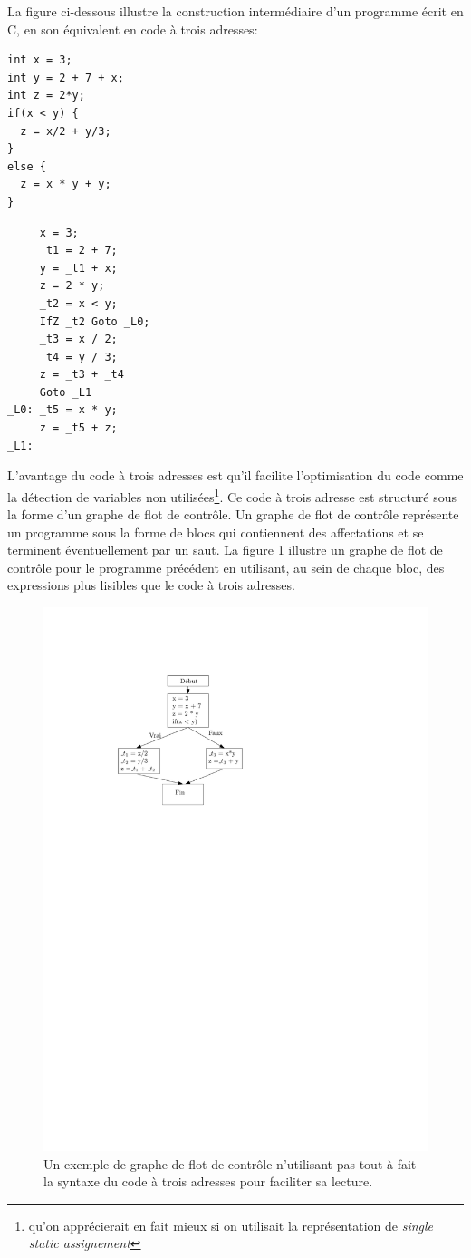 La figure ci-dessous illustre la construction intermédiaire d'un programme écrit en C, en son équivalent en code à trois adresses:

\begin{minipage}[c]{0.4\linewidth}
\begin{lstlisting}
int x = 3;
int y = 2 + 7 + x;
int z = 2*y;
if(x < y) {
  z = x/2 + y/3;
}
else {
  z = x * y + y;
}
\end{lstlisting}
\end{minipage}
\begin{minipage}[c]{0.5\linewidth}
\begin{verbatim}
     x = 3;
     _t1 = 2 + 7;
     y = _t1 + x;
     z = 2 * y;
     _t2 = x < y;
     IfZ _t2 Goto _L0;
     _t3 = x / 2;
     _t4 = y / 3;
     z = _t3 + _t4
     Goto _L1
_L0: _t5 = x * y;
     z = _t5 + z;
_L1:
\end{verbatim}
\end{minipage}

L'avantage du code à trois adresses est qu'il facilite l'optimisation du code comme la détection de variables non utilisées\footnote{qu'on apprécierait en fait mieux si on utilisait la représentation de \emph{single static assignement}}. Ce code à trois adresse est structuré sous la forme d'un graphe de flot de contrôle. Un graphe de flot de contrôle représente un programme sous la forme de blocs qui contiennent des affectations et se terminent éventuellement par un saut. La figure \ref{fig:control_flow_graph} illustre un graphe de flot de contrôle pour le programme précédent en utilisant, au sein de chaque bloc, des expressions plus lisibles que le code à trois adresses. 


\begin{figure}[htbp]
\centering\includegraphics[width=0.5\columnwidth]{Figs/three_adresses.pdf}
\caption{\label{fig:control_flow_graph} Un exemple de graphe de flot de contrôle n'utilisant pas tout à fait la syntaxe du code à trois adresses pour faciliter sa lecture.}
\end{figure}

